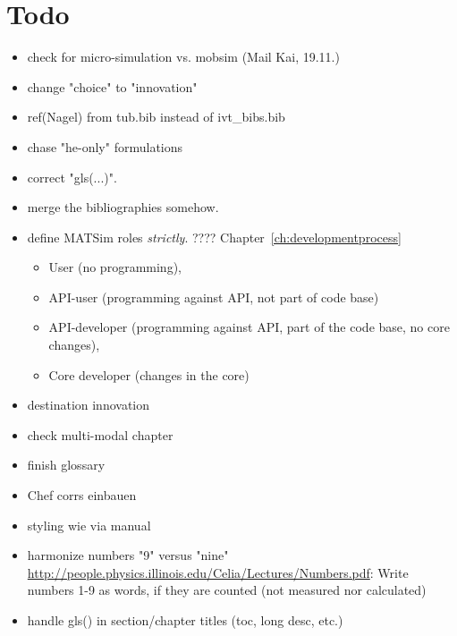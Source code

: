\vfill\eject

\section*{Todo}

\begin{itemize}

\item check for micro-simulation vs. mobsim (Mail Kai, 19.11.)

\item change "choice" to "innovation"

\item ref(Nagel) from tub.bib instead of ivt\_bibs.bib

\item chase "he-only" formulations

\item correct "gls(...)".

\item merge the bibliographies somehow.

\item define MATSim roles \emph{strictly}. ???? Chapter~\ref{ch:developmentprocess}
\begin{itemize}
\item User (no programming), 
\item API-user (programming against API, not part of code base) 
\item API-developer (programming against API, part of the code base, no core changes), 
\item Core developer (changes in the core)
\end{itemize}

\item destination innovation

\item check multi-modal chapter

\item finish glossary

\item Chef corrs einbauen

\item styling wie via manual

\item harmonize numbers "9" versus "nine" \url{http://people.physics.illinois.edu/Celia/Lectures/Numbers.pdf}: Write numbers 1-9 as words, if they are counted (not measured nor calculated)

\item handle gls() in section/chapter titles (toc, long desc, etc.)

\end{itemize}


